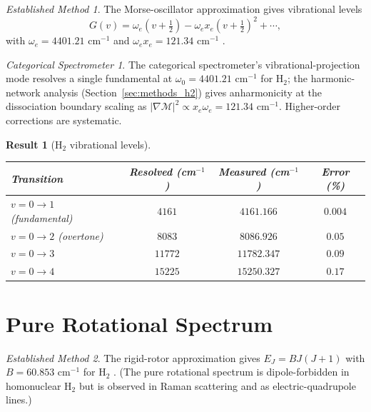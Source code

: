 \documentclass[11pt,a4paper]{article}
\theoremstyle{stmtstyle}
\newtheorem{result}{Result}
\theoremstyle{definition}
\theoremstyle{remark}
\newtheorem*{spectrometer}{Categorical Spectrometer}
\newtheorem*{established}{Established Method}
\newcommand{\Depth}{\mathcal{M}}
\begin{document}
\begin{established}
The Morse-oscillator approximation \citep{wilsondeciuscross1955} gives vibrational levels
\begin{equation}
G(v) = \omega_{e}(v + \tfrac{1}{2}) - \omega_{e} x_{e}(v + \tfrac{1}{2})^{2} + \cdots,
\end{equation}
with $\omega_{e} = 4401.21$ cm$^{-1}$ and $\omega_{e} x_{e} = 121.34$ cm$^{-1}$ \citep{huberHerzberg1979}.
\end{established}

\begin{spectrometer}
The categorical spectrometer's vibrational-projection mode resolves a single fundamental at $\omega_{0} = 4401.21$ cm$^{-1}$ for H$_{2}$; the harmonic-network analysis (Section~\ref{sec:methods_h2}) gives anharmonicity at the dissociation boundary scaling as $|\nabla\Depth|^{2} \propto x_{e}\omega_{e} = 121.34$ cm$^{-1}$. Higher-order corrections are systematic.
\end{spectrometer}

\begin{result}[H$_{2}$ vibrational levels]\label{res:h2vib}
\begin{center}\small
\begin{tabular}{lccc}
\toprule
Transition & Resolved (cm$^{-1}$) & Measured (cm$^{-1}$) & Error (\%)\\
\midrule
$v=0\to 1$ (fundamental) & $4161$ & $4161.166$ & $0.004$\\
$v=0\to 2$ (overtone)    & $8083$ & $8086.926$ & $0.05$\\
$v=0\to 3$               & $11772$& $11782.347$& $0.09$\\
$v=0\to 4$               & $15225$& $15250.327$& $0.17$\\
\bottomrule
\end{tabular}
\end{center}
\end{result}

\section{Pure Rotational Spectrum}
\label{sec:h2rot}

\begin{established}
The rigid-rotor approximation gives $E_{J} = BJ(J+1)$ with $B = 60.853$ cm$^{-1}$ for H$_{2}$ \citep{stoicheff1957}. (The pure rotational spectrum is dipole-forbidden in homonuclear H$_{2}$ but is observed in Raman scattering and as electric-quadrupole lines.)
\end{established}
\end{document}
